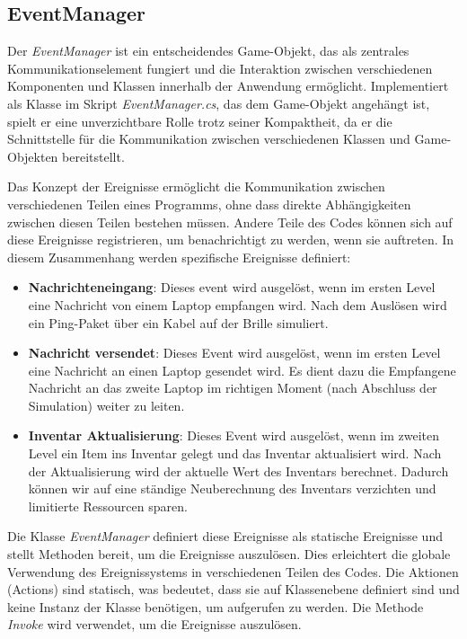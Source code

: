 \subsection{EventManager}

Der \textit{EventManager} ist ein entscheidendes Game-Objekt, das als zentrales Kommunikationselement fungiert und die
Interaktion zwischen verschiedenen Komponenten und Klassen innerhalb der Anwendung ermöglicht. Implementiert als Klasse
im Skript \textit{EventManager.cs}, das dem Game-Objekt angehängt ist, spielt er eine unverzichtbare Rolle trotz seiner
Kompaktheit, da er die Schnittstelle für die Kommunikation zwischen verschiedenen Klassen und Game-Objekten bereitstellt.

Das Konzept der Ereignisse ermöglicht die Kommunikation zwischen verschiedenen Teilen eines Programms, ohne dass direkte
Abhängigkeiten zwischen diesen Teilen bestehen müssen. Andere Teile des Codes können sich auf diese Ereignisse registrieren,
um benachrichtigt zu werden, wenn sie auftreten. In diesem Zusammenhang werden spezifische Ereignisse definiert:

\begin{itemize}
\item \textbf{Nachrichteneingang}: Dieses event wird ausgelöst, wenn im ersten Level eine Nachricht von einem Laptop
empfangen wird. Nach dem Auslösen wird ein Ping-Paket über ein Kabel auf der Brille simuliert.
\item \textbf{Nachricht versendet}: Dieses Event wird ausgelöst, wenn im ersten Level eine Nachricht an einen Laptop
gesendet wird. Es dient dazu die Empfangene Nachricht an das zweite Laptop im richtigen Moment (nach Abschluss der
Simulation) weiter zu leiten.
\item \textbf{Inventar Aktualisierung}: Dieses Event wird ausgelöst, wenn im zweiten Level ein Item ins Inventar gelegt und
das Inventar aktualisiert wird. Nach der Aktualisierung wird der aktuelle Wert des Inventars berechnet. Dadurch können
wir auf eine ständige Neuberechnung des Inventars verzichten und limitierte Ressourcen sparen.
\end{itemize}

Die Klasse \textit{EventManager} definiert diese Ereignisse als statische Ereignisse und stellt Methoden bereit, um die
Ereignisse auszulösen. Dies erleichtert die globale Verwendung des Ereignissystems in verschiedenen Teilen des Codes.
Die Aktionen (Actions) sind statisch, was bedeutet, dass sie auf Klassenebene definiert sind und keine Instanz der Klasse
benötigen, um aufgerufen zu werden. Die Methode \textit{Invoke} wird verwendet, um die Ereignisse auszulösen.

